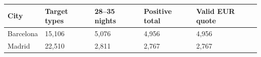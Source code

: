 \begin{tabular}{lllll}
\toprule
City & Target types & 28--35 nights & Positive total & Valid EUR quote \\
\midrule
Barcelona & 15,106 & 5,076 & 4,956 & 4,956 \\
Madrid & 22,510 & 2,811 & 2,767 & 2,767 \\
\bottomrule
\end{tabular}

